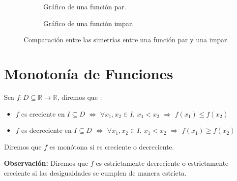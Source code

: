 \documentclass[12pt]{book}
\begin{document}
\begin{figure}[H]
    \centering
    \begin{subfigure}{0.45\textwidth}
        \centering
        \caption{Gráfico de una función par.}
    \end{subfigure}
\hspace{0.5cm}
    \begin{subfigure}{0.45\textwidth}
        \centering
        \caption{Gráfico de una función impar.}
    \end{subfigure}
    \caption{Comparación entre las simetrías entre una función par y una impar.}
\end{figure}

\section{Monotonía de Funciones}

\begin{defi}{}{}
    Sea $f : D \subseteq \mathbb{R} \to \mathbb{R}$, diremos que :
    \begin{itemize}
        \item $f$ es creciente en $I \subseteq D$ $\Longleftrightarrow$ $\forall x_1, x_2 \in I$, $x_1 < x_2$ $\Longrightarrow$ $f(x_1)\leq f(x_2)$

        \item $f$ es decreciente en $I \subseteq D$ $\Longleftrightarrow$ $\forall x_1, x_2 \in I$, $x_1 < x_2$ $\Longrightarrow$ $f(x_1)\geq f(x_2)$
    \end{itemize}
    Diremos que $f$ es monótona si es creciente o decreciente.
\end{defi}
\textbf{Observación:} Diremos que $f$ es estrictamente decreciente o estrictamente creciente si las desigualdades se cumplen de manera estricta.
\end{document}
